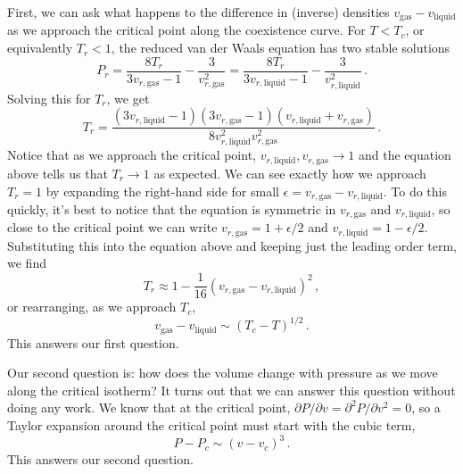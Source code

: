 \documentclass{article}
\theoremstyle{plain}\theoremheaderfont{\normalfont\bfseries}\theorembodyfont{\rmfamily}\theoremseparator{.}\newtheorem*{thm}{Theorem}\newtheorem*{law}{Law}\newtheorem*{pos}{Postulate}
\numberwithin{equation}{section}
\begin{document}
    First, we can ask what happens to the difference in (inverse) densities \(v_{\text{gas}}-v_{\text{liquid}}\) as we approach the critical point along the coexistence curve. For \(T<T_c\), or equivalently \(T_r<1\), the reduced van der Waals equation has two stable solutions
    \begin{equation}
        P_r=\frac{8T_r}{3v_{r,\text{gas}}-1}-\frac{3}{v_{r,\text{gas}}^2}=\frac{8T_r}{3v_{r,\text{liquid}}-1}-\frac{3}{v_{r,\text{liquid}}^2}\,.
    \end{equation}
    Solving this for \(T_r\), we get
    \begin{equation}
        T_r=\frac{(3v_{r,\text{liquid}}-1)(3v_{r,\text{gas}}-1)(v_{r,\text{liquid}}+v_{r,\text{gas}})}{8v_{r,\text{liquid}}^2 v_{r,\text{gas}}^2}\,.
    \end{equation}
    Notice that as we approach the critical point, \(v_{r,\text{liquid}},v_{r,\text{gas}}\to 1\) and the equation above tells us that \(T_r\to 1\) as expected. We can see exactly how we approach \(T_r=1\) by expanding the right-hand side for small \(\epsilon=v_{r,\text{gas}}-v_{r,\text{liquid}}\). To do this quickly, it's best to notice that the equation is symmetric in \(v_{r,\text{gas}}\) and \(v_{r,\text{liquid}}\), so close to the critical point we can write \(v_{r,\text{gas}}=1+\epsilon/2\) and \(v_{r,\text{liquid}}=1-\epsilon/2\). Substituting this into the equation above and keeping just the leading order term, we find
    \begin{equation}
        T_r\approx 1-\frac{1}{16}(v_{r,\text{gas}}-v_{r,\text{liquid}})^2\,,
    \end{equation}
    or rearranging, as we approach \(T_c\),
    \begin{equation}
        v_{\text{gas}}-v_{\text{liquid}}\sim(T_c-T)^{1/2}\,.
    \end{equation}
    This answers our first question.

    Our second question is: how does the volume change with pressure as we move along the critical isotherm? It turns out that we can answer this question without doing any work. We know that at the critical point, \(\partial P/\partial v=\partial^2 P/\partial v^2=0\), so a Taylor expansion around the critical point must start with the cubic term,
    \begin{equation}\label{pressure_critical_exponent}
        P-P_c\sim(v-v_c)^3\,.
    \end{equation}
    This answers our second question.
\end{document}
